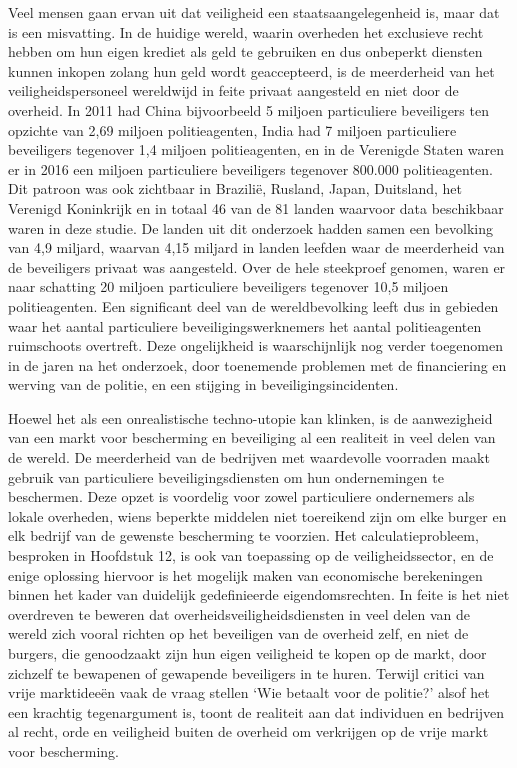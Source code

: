 Veel mensen gaan ervan uit dat veiligheid een staatsaangelegenheid is, maar dat is een misvatting. In de huidige wereld, waarin overheden het exclusieve recht hebben om hun eigen krediet als geld te gebruiken en dus onbeperkt diensten kunnen inkopen zolang hun geld wordt geaccepteerd, is de meerderheid van het veiligheidspersoneel wereldwijd in feite privaat aangesteld en niet door de overheid. In 2011 had China bijvoorbeeld 5 miljoen particuliere beveiligers ten opzichte van 2,69 miljoen politieagenten, India had 7 miljoen particuliere beveiligers tegenover 1,4 miljoen politieagenten, en in de Verenigde Staten waren er in 2016 een miljoen particuliere beveiligers tegenover 800.000 politieagenten. Dit patroon was ook zichtbaar in Brazilië, Rusland, Japan, Duitsland, het Verenigd Koninkrijk en in totaal 46 van de 81 landen waarvoor data beschikbaar waren in deze studie. De landen uit dit onderzoek hadden samen een bevolking van 4,9 miljard, waarvan 4,15 miljard in landen leefden waar de meerderheid van de beveiligers privaat was aangesteld. Over de hele steekproef genomen, waren er naar schatting 20 miljoen particuliere beveiligers tegenover 10,5 miljoen politieagenten. Een significant deel van de wereldbevolking leeft dus in gebieden waar het aantal particuliere beveiligingswerknemers het aantal politieagenten ruimschoots overtreft. Deze ongelijkheid is waarschijnlijk nog verder toegenomen in de jaren na het onderzoek, door toenemende problemen met de financiering en werving van de politie, en een stijging in beveiligingsincidenten.\autocite{198}

Hoewel het als een onrealistische techno-utopie kan klinken, is de aanwezigheid van een markt voor bescherming en beveiliging al een realiteit in veel delen van de wereld. De meerderheid van de bedrijven met waardevolle voorraden maakt gebruik van particuliere beveiligingsdiensten om hun ondernemingen te beschermen. Deze opzet is voordelig voor zowel particuliere ondernemers als lokale overheden, wiens beperkte middelen niet toereikend zijn om elke burger en elk bedrijf van de gewenste bescherming te voorzien. Het calculatieprobleem, besproken in Hoofdstuk 12, is ook van toepassing op de veiligheidssector, en de enige oplossing hiervoor is het mogelijk maken van economische berekeningen binnen het kader van duidelijk gedefinieerde eigendomsrechten. In feite is het niet overdreven te beweren dat overheidsveiligheidsdiensten in veel delen van de wereld zich vooral richten op het beveiligen van de overheid zelf, en niet de burgers, die genoodzaakt zijn hun eigen veiligheid te kopen op de markt, door zichzelf te bewapenen of gewapende beveiligers in te huren. Terwijl critici van vrije marktideeën vaak de vraag stellen `Wie betaalt voor de politie?' alsof het een krachtig tegenargument is, toont de realiteit aan dat individuen en bedrijven al recht, orde en veiligheid buiten de overheid om verkrijgen op de vrije markt voor bescherming.

